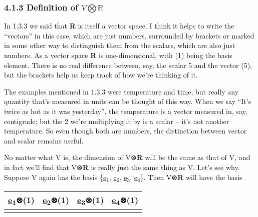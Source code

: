 \documentclass[oneside,english]{amsbook}
\numberwithin{section}{chapter}
\theoremstyle{plain}
\theoremstyle{definition}
\begin{document}
\subsubsection{\texorpdfstring{4.1.3 Definition of
		\(V\bigotimes\mathbb{R}\)}{4.1.3 Definition of V\textbackslash bigotimes\textbackslash mathbb\{R\}}}\label{definition-of-vbigotimesmathbbr}

In 1.3.3 we said that \textbf{R} is itself a vector space. I think it
helps to write the ``vectors'' in this case, which are just numbers,
surrounded by brackets or marked in some other way to distinguish them
from the scalars, which are also just numbers. As a vector space
\textbf{R} is one-dimensional, with (1) being the basis element. There
is no real difference between, say, the scalar 5 and the vector (5), but
the brackets help us keep track of how we're thinking of it.

The examples mentioned in 1.3.3 were temperature and time, but really
any quantity that's measured in units can be thought of this way. When
we say ``It's twice as hot as it was yesterday'', the temperature is a
vector measured in, say, centigrade; but the 2 we're multiplying it by
is a scalar -- it's not another temperature. So even though both are
numbers, the distinction between vector and scalar remains useful.

No matter what V is, the dimension of V⊗\textbf{R} will be the same as
that of V, and in fact we'll find that V⊗\textbf{R} is really just the
same thing as V. Let's see why. Suppose V again has the basis
\{\ul{e}\textsubscript{1}, \ul{e}\textsubscript{2},
\ul{e}\textsubscript{3}, \ul{e}\textsubscript{4}\}. Then V⊗\textbf{R}
will have the basis

\begin{longtable}[]{@{}
		>{\raggedright\arraybackslash}p{}
		>{\raggedright\arraybackslash}p{}
		>{\raggedright\arraybackslash}p{}
		>{\raggedright\arraybackslash}p{}@{}}
	\toprule\noalign{}
	\begin{minipage}[b]{\linewidth}\centering
		\ul{e}\textsubscript{1}⊗(1)
	\end{minipage} & \begin{minipage}[b]{\linewidth}\centering
		\ul{e}\textsubscript{2}⊗(1)
	\end{minipage} & \begin{minipage}[b]{\linewidth}\centering
		\ul{e}\textsubscript{3}⊗(1)
	\end{minipage} & \begin{minipage}[b]{\linewidth}\centering
		\ul{e}\textsubscript{4}⊗(1)
	\end{minipage} \\
	\midrule\noalign{}
	\endhead
	\bottomrule\noalign{}
	\endlastfoot
\end{longtable}
\end{document}

